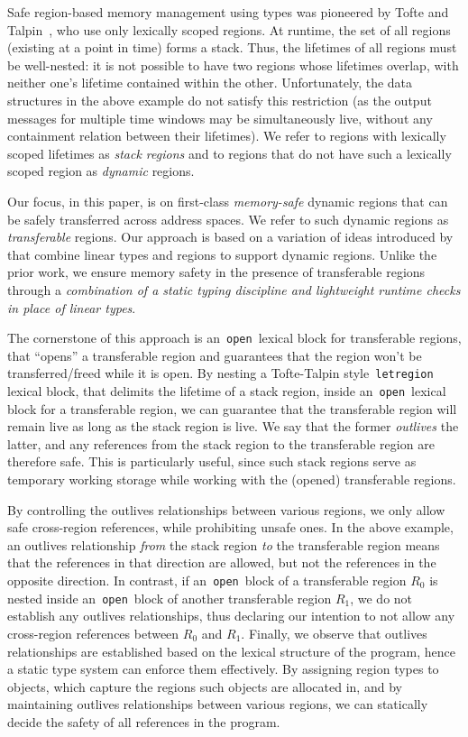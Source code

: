 \documentclass[a4paper,UKenglish]{lipics-v2018}
\newcommand{\C}[1]{\code{#1}}
\newcommand{\code}[1]{\,{\tt #1}\,}
\begin{document}
Safe region-based memory management using types was
pioneered by Tofte and Talpin~\cite{tofte94,tofte97}, who 
use only lexically scoped regions.  At runtime, the set of all regions
(existing at a point in time) forms a stack. Thus, the lifetimes of
all regions must be well-nested: it is not possible to have two
regions whose lifetimes overlap, with neither one's lifetime contained
within the other.  Unfortunately, the data structures in the above
example do not satisfy this restriction (as the output messages for
multiple time windows may be simultaneously live, without any
containment relation between their lifetimes).  We refer to regions
with lexically scoped lifetimes as \emph{stack regions} and to regions
that do not have such a lexically scoped region as \emph{dynamic}
regions.

Our focus, in this paper, is on first-class \emph{memory-safe} dynamic regions
that can be safely transferred across address spaces. We refer to such dynamic
regions as \emph{transferable} regions.
%
Our approach is based on a variation of ideas introduced by~\cite{WW01,cyclone04}
that combine linear types and regions to support dynamic regions.
Unlike the prior work, we ensure memory safety in the presence of
transferable regions through a \emph{combination of a static
typing discipline and lightweight runtime checks in place of linear types}.

The cornerstone of this approach is an \C{open} lexical block for
transferable regions, that ``opens'' a transferable region and
guarantees that the region won't be transferred/freed while it is
open. By nesting a Tofte-Talpin style \C{letregion} lexical block,
that delimits the lifetime of a stack region, inside an \C{open}
lexical block for a transferable region, we can guarantee that the
transferable region will remain live as long as the stack region is
live. We say that the former \emph{outlives} the latter, and any
references from the stack region to the transferable region are
therefore safe. This is particularly useful, since such stack regions
serve as temporary working storage while working with the (opened)
transferable regions.

By controlling the outlives relationships between various
regions, we only allow safe cross-region references, while prohibiting
unsafe ones. In the above example, an outlives relationship
\emph{from} the stack region \emph{to} the transferable region means
that the references in that direction are allowed, but not the
references in the opposite direction. In contrast, if an \C{open}
block of a transferable region $R_0$ is nested inside an \C{open}
block of another transferable region $R_1$, we do not establish any
outlives relationships, thus declaring our intention to not allow any
cross-region references between $R_0$ and $R_1$.  Finally, we observe
that outlives relationships are established based on the lexical
structure of the program, hence a static type system can enforce them
effectively. By assigning region types to objects, which capture the
regions such objects are allocated in, and by maintaining outlives
relationships between various regions, we can statically decide the
safety of all references in the program.
\end{document}
